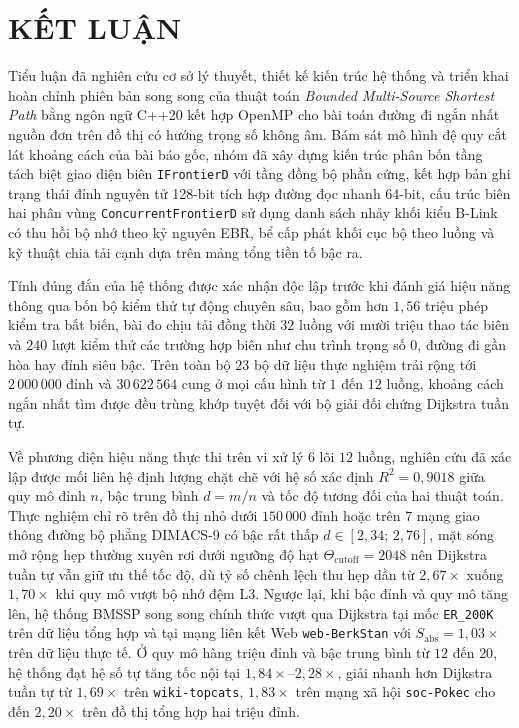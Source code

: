 \documentclass[12pt,a4paper,openany,oneside]{report}
\theoremstyle{plain}
\numberwithin{equation}{section}
\begin{document}
\chapter*{KẾT LUẬN}

Tiểu luận đã nghiên cứu cơ sở lý thuyết, thiết kế kiến trúc hệ thống và triển khai hoàn chỉnh phiên bản song song của thuật toán \textit{Bounded Multi-Source Shortest Path} bằng ngôn ngữ C++20 kết hợp OpenMP cho bài toán đường đi ngắn nhất nguồn đơn trên đồ thị có hướng trọng số không âm. Bám sát mô hình đệ quy cắt lát khoảng cách của bài báo gốc, nhóm đã xây dựng kiến trúc phân bốn tầng tách biệt giao diện biên \texttt{IFrontierD} với tầng đồng bộ phần cứng, kết hợp bản ghi trạng thái đỉnh nguyên tử 128-bit tích hợp đường đọc nhanh 64-bit, cấu trúc biên hai phân vùng \texttt{Concurrent\allowbreak FrontierD} sử dụng danh sách nhảy khối kiểu B-Link có thu hồi bộ nhớ theo kỷ nguyên EBR, bể cấp phát khối cục bộ theo luồng và kỹ thuật chia tải cạnh dựa trên mảng tổng tiền tố bậc ra.

Tính đúng đắn của hệ thống được xác nhận độc lập trước khi đánh giá hiệu năng thông qua bốn bộ kiểm thử tự động chuyên sâu, bao gồm hơn $1{,}56$ triệu phép kiểm tra bất biến, bài đo chịu tải đồng thời $32$ luồng với mười triệu thao tác biên và $240$ lượt kiểm thử các trường hợp biên như chu trình trọng số $0$, đường đi gần hòa hay đỉnh siêu bậc. Trên toàn bộ $23$ bộ dữ liệu thực nghiệm trải rộng tới $2\,000\,000$ đỉnh và $30\,622\,564$ cung ở mọi cấu hình từ $1$ đến $12$ luồng, khoảng cách ngắn nhất tìm được đều trùng khớp tuyệt đối với bộ giải đối chứng Dijkstra tuần tự.

Về phương diện hiệu năng thực thi trên vi xử lý $6$ lõi $12$ luồng, nghiên cứu đã xác lập được mối liên hệ định lượng chặt chẽ với hệ số xác định $R^2 = 0{,}9018$ giữa quy mô đỉnh $n$, bậc trung bình $d = m/n$ và tốc độ tương đối của hai thuật toán. Thực nghiệm chỉ rõ trên đồ thị nhỏ dưới $150\,000$ đỉnh hoặc trên $7$ mạng giao thông đường bộ phẳng DIMACS-9 có bậc rất thấp $d \in [2{,}34;\, 2{,}76]$, mặt sóng mở rộng hẹp thường xuyên rơi dưới ngưỡng độ hạt $\Theta_{\mathrm{cutoff}} = 2048$ nên Dijkstra tuần tự vẫn giữ ưu thế tốc độ, dù tỷ số chênh lệch thu hẹp dần từ $2{,}67\times$ xuống $1{,}70\times$ khi quy mô vượt bộ nhớ đệm L3. Ngược lại, khi bậc đỉnh và quy mô tăng lên, hệ thống BMSSP song song chính thức vượt qua Dijkstra tại mốc \texttt{ER\_200K} trên dữ liệu tổng hợp và tại mạng liên kết Web \texttt{web-BerkStan} với $S_{\mathrm{abs}} = 1{,}03\times$ trên dữ liệu thực tế. Ở quy mô hàng triệu đỉnh và bậc trung bình từ $12$ đến $20$, hệ thống đạt hệ số tự tăng tốc nội tại $1{,}84\times$--$2{,}28\times$, giải nhanh hơn Dijkstra tuần tự từ $1{,}69\times$ trên \texttt{wiki-topcats}, $1{,}83\times$ trên mạng xã hội \texttt{soc-Pokec} cho đến $2{,}20\times$ trên đồ thị tổng hợp hai triệu đỉnh.
\end{document}
